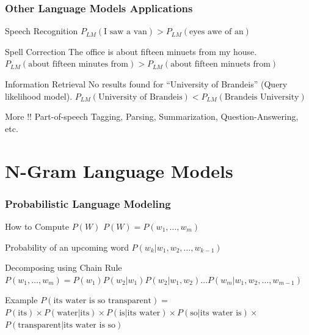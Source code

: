 \documentclass{beamer}
\begin{document}
\begin{frame}\frametitle{Other Language Models Applications}

\begin{block}{Speech Recognition}
  \quad $P_{LM}(\text{I saw a van}) > P_{LM}(\text{eyes awe of an})$
\end{block}

\begin{block}{Spell Correction}
The office is about fifteen minuets from my house. \\
  \quad $P_{LM}(\text{about fifteen minutes from}) >
  P_{LM}(\text{about fifteen minuets from})$
\end{block}

\begin{block}{Information Retrieval}
No results found for ``University of Brandeis'' (Query likelihood model).
  \quad $P_{LM}(\text{University of Brandeis}) <
  P_{LM}(\text{Brandeis University})$
\end{block}

\begin{block}{More !!}
Part-of-speech Tagging, Parsing, Summarization, Question-Answering,
etc.
\end{block}
\end{frame}


\section{N-Gram Language Models}

\begin{frame}\frametitle{Probabilistic Language Modeling}

\begin{block}{How to Compute $P(W)$}
  \quad $P(W) = P(w_1,\ldots,w_m)$
\end{block}

\begin{block}{Probability of an upcoming word}
 \quad  $P(w_k|w_1, w_2, \ldots, w_{k-1})$
\end{block}

\begin{block}{Decomposing using Chain Rule}
  \quad $P(w_1,\ldots,w_m) = P(w_1)P(w_2|w_1)P(w_2|w_1, w_2)\ldots P(w_m|w_1, w_2, \ldots, w_{m-1})$
\end{block}

\begin{block}{Example}
\quad $P(\text{its water is so transparent}) = $ \\ $P(\text{its})
\times P(\text{water}|\text{its}) \times P(\text{is}|\text{its water})
\times P(\text{so}|\text{its water is}) \times $ \\
$P(\text{transparent}|\text{its water is so})$
\end{block}
\end{frame}
\end{document}
